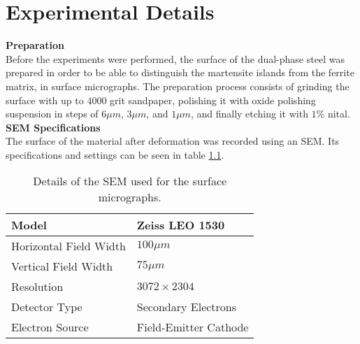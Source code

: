 
\chapter{Experimental Details} %
\label{sec:ExperimentalDetails}


\textbf{Preparation} \\
Before the experiments were performed, the surface of the dual-phase steel was prepared in order to be able to distinguish the martensite islands from the ferrite matrix, in surface micrographs. The preparation process consists of grinding the surface with up to $4000$ grit sandpaper, polishing it with oxide polishing suspension in steps of $6\mu m$, $3\mu m$, and $1\mu m$, and finally etching it with $1 \%$ nital. \\


\noindent \textbf{SEM Specifications} \\
The surface of the material after deformation was recorded using an SEM. Its specifications and settings can be seen in table \ref{tab:SEM}. \\

\begin{table}[H]
 \begin{center}
  \begin{tabular}{@{} *2l @{}} \toprule[2pt]
   Model & Zeiss LEO 1530 \\\midrule
   Horizontal Field Width & $100\mu m$   \\ 
   Vertical Field Width  & $75\mu m$ \\ 
   Resolution  & $3072\times 2304$ \\
   Detector Type & Secondary Electrons \\
   Electron Source & Field-Emitter Cathode \\ \bottomrule[2pt]

  \end{tabular}
 \end{center}
 \caption{Details of the SEM used for the surface micrographs.}
   \label{tab:SEM}
\end{table}

